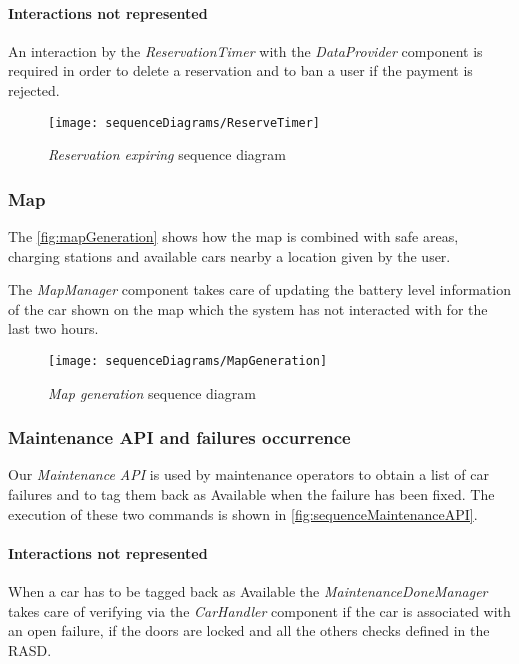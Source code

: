 \paragraph{Interactions not represented} An interaction by the \emph{ReservationTimer} with the \emph{DataProvider} component is required in order to delete a reservation and to ban a user if the payment is rejected.
\begin{figure}[h!]
	\centering
	\texttt{[image: sequenceDiagrams/ReserveTimer]}
	\caption{
		\label{fig:sequenceReserveTimer} 
		\emph{Reservation expiring} sequence diagram
	}
\end{figure}

\clearpage
\subsubsection{Map}
The \autoref{fig:mapGeneration} shows how the map is combined with safe areas, charging stations and available cars nearby a location given by the user.

The \emph{MapManager} component takes care of updating the battery level information of the car shown on the map which the system has not interacted with for the last two hours.

\begin{figure}[h!]
	\centering
	\texttt{[image: sequenceDiagrams/MapGeneration]}
	\caption{
		\label{fig:mapGeneration} 
		\emph{Map generation} sequence diagram
	}
\end{figure}

\clearpage
\subsubsection{Maintenance API and failures occurrence}
Our \emph{Maintenance API} is used by maintenance operators to obtain a list of car failures and to tag them back as Available when the failure has been fixed. The execution of these two commands is shown in \autoref{fig:sequenceMaintenanceAPI}.
\paragraph{Interactions not represented}When a car has to be tagged back as \mbox{Available} the \emph{MaintenanceDoneManager} takes care of verifying via the \emph{CarHandler} component if the car is associated with an open failure, if the doors are locked and all the others checks defined in the RASD.

